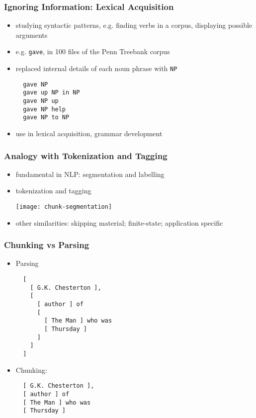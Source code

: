 \begin{frame}[fragile]
  \frametitle{Ignoring Information: Lexical Acquisition}

  \begin{itemize}
  \item studying syntactic patterns, e.g. finding verbs in a corpus, displaying possible arguments
  \item e.g. \texttt{gave}, in 100 files of the Penn Treebank corpus
  \item replaced internal details of each noun phrase with \texttt{NP}

\begin{lstlisting}
  gave NP
  gave up NP in NP
  gave NP up
  gave NP help
  gave NP to NP
\end{lstlisting}
    
  \item use in lexical acquisition, grammar development
  \end{itemize}
\end{frame}

\begin{frame}[fragile]
  \frametitle{Analogy with Tokenization and Tagging}

  \begin{itemize}
  \item fundamental in NLP: segmentation and labelling
  \item tokenization and tagging \\[2ex]
	  \begin{center}
	\texttt{[image: chunk-segmentation]}
	\end{center}

  \item other similarities: skipping material; finite-state; application specific
  \end{itemize}
\end{frame}

\begin{frame}[fragile]\frametitle{Chunking vs Parsing}
  \scriptsize

  \begin{itemize}
  \item Parsing
\begin{lstlisting}
  [
    [ G.K. Chesterton ],
    [
      [ author ] of
      [
        [ The Man ] who was
        [ Thursday ]
      ]
    ]
  ]
\end{lstlisting}

  \item Chunking:
\begin{lstlisting}
  [ G.K. Chesterton ],
  [ author ] of
  [ The Man ] who was
  [ Thursday ]
\end{lstlisting}
\end{itemize}
\end{frame}

